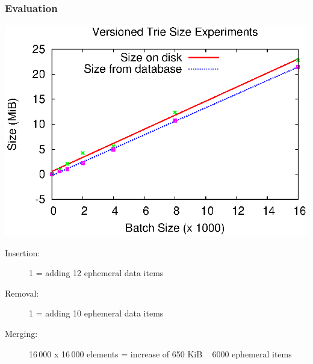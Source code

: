 \begin{frame}[fragile]
	\frametitle{Evaluation}

	\begin{minipage}{0.5\textwidth}
		\includegraphics[width=\textwidth]{images/chart.eps}
	\end{minipage}%
	\begin{minipage}{0.5\textwidth}
		\begin{description}
			\item[Insertion:] 1 = adding 12 ephemeral data items
			\item[Removal:] 1 = adding 10 ephemeral data  items
			\item[Merging:] 16\,000 x 16\,000 elements = increase of 650 KiB ~ 6000 ephemeral items
		\end{description}
	\end{minipage}

\end{frame}